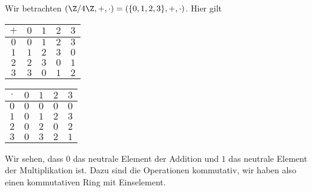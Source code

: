 \documentclass[letterpaper,10pt,english]{jupyterBook}
\begin{document}
\begin{example}{}{}



Wir betrachten \((\Z/4\Z, +,\cdot)=(\{0,1,2,3\},+,\cdot)\). Hier gilt


\begin{center}
\centering
\begin{tabularx}{\linewidth}[{\linewidth}]{|c|c|c|c|c|}\hline
 
\(+\)
& 
\(0\)
& 
\(1\)
& 
\(2\)
& 
\(3\)
\\
\hline
\(0\)
&
\(0\)
&
\(1\)
&
\(2\)
&
\(3\)
\\
\hline
\(1\)
&
\(1\)
&
\(2\)
&
\(3\)
&
\(0\)
\\
\hline
\(2\)
&
\(2\)
&
\(3\)
&
\(0\)
&
\(1\)
\\
\hline
\(3\)
&
\(3\)
&
\(0\)
&
\(1\)
&
\(2\)
\\
\hline
\end{tabularx}
\end{center}


\begin{center}
\centering
\begin{tabularx}{\linewidth}[{\linewidth}]{|c|c|c|c|c|}\hline
 
\(\cdot\)
& 
\(0\)
& 
\(1\)
& 
\(2\)
& 
\(3\)
\\
\hline
\(0\)
&
\(0\)
&
\(0\)
&
\(0\)
&
\(0\)
\\
\hline
\(1\)
&
\(0\)
&
\(1\)
&
\(2\)
&
\(3\)
\\
\hline
\(2\)
&
\(0\)
&
\(2\)
&
\(0\)
&
\(2\)
\\
\hline
\(3\)
&
\(0\)
&
\(3\)
&
\(2\)
&
\(1\)
\\
\hline
\end{tabularx}
\end{center}

Wir sehen, dass \(0\) das neutrale Element der Addition und \(1\) das neutrale Element der Multiplikation ist. Dazu sind die Operationen kommutativ, wir haben also einen kommutativen Ring mit Einselement.
\end{example}
\end{document}
